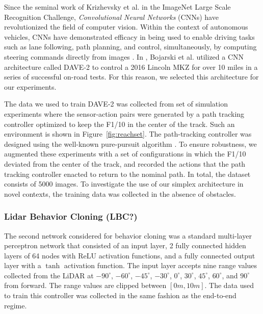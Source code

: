 \documentclass[manuscript,screen,review]{acmart}
\begin{document}
Since the seminal work of Krizhevsky et al. \cite{AlexNet2012} in the ImageNet Large Scale Recognition Challenge, \emph{Convolutional Neural Networks} (CNNs) have revolutionized the field of computer vision. Within the context of autonomous vehicles, CNNs have demonstrated efficacy in being used to enable driving tasks such as lane following, path planning, and control, simultaneously, by computing steering commands directly from images \cite{DeepDrive2015}. In \cite{bojarski2016end}, Bojarski et al. utilized a CNN architecture called DAVE-2 to control a 2016 Lincoln MKZ for over 10 miles in a series of successful on-road tests. For this reason, we selected this architecture for our experiments. 

The data we used to train DAVE-2 was collected from set of simulation experiments where the sensor-action pairs were generated by a path tracking controller optimized to keep the F1/10 in the center of the track. Such an environment is shown in Figure~\ref{fig:reachset}. The path-tracking controller was designed using the well-known pure-pursuit algorithm \cite{coulter1992implementation}. To ensure robustness, we augmented these experiments with a set of configurations in which the F1/10 deviated from the center of the track, and recorded the actions that the path tracking controller enacted to return to the nominal path. In total, the dataset consists of 5000 images.  To investigate the use of our simplex architecture in novel contexts, the training data was collected in the absence of obstacles.
 



\subsubsection{Lidar Behavior Cloning (LBC?)}
\label{sec:lidar cloning}
The second network considered for behavior cloning was a standard multi-layer perceptron network that consisted of an input layer, 2 fully connected hidden layers of 64 nodes with ReLU activation functions, and a fully connected output layer with a $\tanh$ activation function. The input layer accepts nine range values collected from the LiDAR at $-90^{\circ}$, $-60^{\circ}$, $-45^{\circ}$, $-30^{\circ}$, $0^{\circ}$, $30^{\circ}$, $45^{\circ}$, $60^{\circ}$, and $90^{\circ}$ from forward. The range values are clipped between $[0m, 10m]$. The data used to train this controller was collected in the same fashion as the end-to-end regime. 
\end{document}
